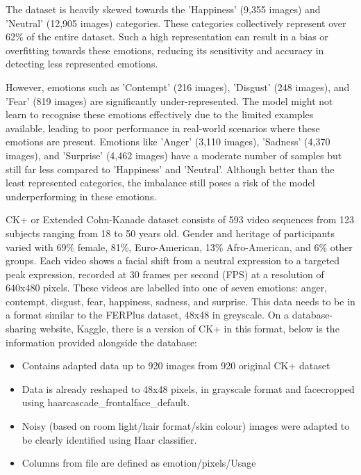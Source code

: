 The dataset is heavily skewed towards the 'Happiness' (9,355 images) and 'Neutral' (12,905 images) categories. These categories collectively represent over 62\% of the entire dataset. Such a high representation can result in a bias or overfitting \cite{Rangulov2020-pd} towards these emotions, reducing its sensitivity and accuracy in detecting less represented emotions.

However, emotions such as 'Contempt' (216 images), 'Disgust' (248 images), and 'Fear' (819 images) are significantly under-represented. The model might not learn to recognise these emotions effectively due to the limited examples available, leading to poor performance in real-world scenarios where these emotions are present. Emotions like 'Anger' (3,110 images), 'Sadness' (4,370 images), and 'Surprise' (4,462 images) have a moderate number of samples but still far less compared to 'Happiness' and 'Neutral'. Although better than the least represented categories, the imbalance still poses a risk of the model underperforming in these emotions.

CK+ or Extended Cohn-Kanade dataset consists of 593 video sequences from 123 subjects ranging from 18 to 50 years old. Gender and heritage of participants varied with 69\% female, 81\%, Euro-American, 13\% Afro-American, and 6\% other groups. Each video shows a facial shift from a neutral expression to a targeted peak expression, recorded at 30 frames per second (FPS) at a resolution of 640x480 pixels. These videos are labelled into one of seven emotions: anger, contempt, disgust, fear, happiness, sadness, and surprise. This data needs to be in a format similar to the FERPlus dataset, 48x48 in greyscale. On a database-sharing website, Kaggle, there is a version of CK+ in this format, below is the information provided alongside the database: 

\begin{itemize}
    \item Contains adapted data up to 920 images from 920 original CK+ dataset
    \item Data is already reshaped to 48x48 pixels, in grayscale format and facecropped using haarcascade\_frontalface\_default.
    \item Noisy (based on room light/hair format/skin colour) images were adapted to be clearly identified using Haar classifier.
    \item Columns from file are defined as emotion/pixels/Usage
\end{itemize}

